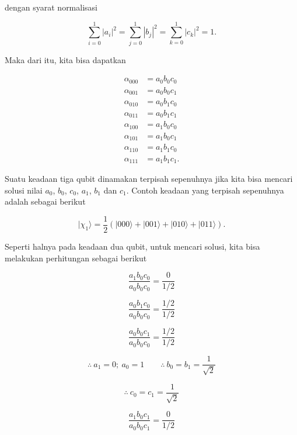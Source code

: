dengan syarat normalisasi

\begin{equation}
\sum_{i=0}^{1} |a_i|^2
=
\sum_{j=0}^{1} |b_j|^2
=
\sum_{k=0}^{1} |c_k|^2
= 1 .
\end{equation}

Maka dari itu, kita bisa dapatkan

\begin{align}
\alpha_{000} &= a_0 b_0 c_0 \nonumber \\
\alpha_{001} &= a_0 b_0 c_1 \nonumber \\
\alpha_{010} &= a_0 b_1 c_0 \nonumber \\
\alpha_{011} &= a_0 b_1 c_1 \nonumber \\
\alpha_{100} &= a_1 b_0 c_0 \nonumber \\
\alpha_{101} &= a_1 b_0 c_1 \nonumber \\
\alpha_{110} &= a_1 b_1 c_0 \nonumber \\
\alpha_{111} &= a_1 b_1 c_1 .
\end{align}

Suatu keadaan tiga qubit dinamakan terpisah sepenuhnya jika kita bisa mencari solusi
nilai $a_0$, $b_0$, $c_0$, $a_1$, $b_1$ dan $c_1$. Contoh keadaan
yang terpisah sepenuhnya adalah sebagai berikut

\begin{equation}
|\chi_1\rangle =
\frac{1}{2}
\left(
|000\rangle + |001\rangle + |010\rangle + |011\rangle
\right) .
\end{equation}

Seperti halnya pada keadaan dua qubit, untuk mencari solusi,
kita bisa melakukan perhitungan sebagai berikut

\begin{equation}
\frac{a_1 b_0 c_0}{a_0 b_0 c_0}
=
\frac{0}{1/2}
\end{equation}

\begin{equation}
\frac{a_0 b_1 c_0}{a_0 b_0 c_0}
=
\frac{1/2}{1/2}
\end{equation}

\begin{equation}
\frac{a_0 b_0 c_1}{a_0 b_0 c_0}
=
\frac{1/2}{1/2}
\end{equation}

\[
\therefore \ a_1 = 0 ; \ a_0 = 1
\qquad
\therefore \ b_0 = b_1 = \frac{1}{\sqrt{2}}
\]

\[
\therefore \ c_0 = c_1 = \frac{1}{\sqrt{2}}
\]

\begin{equation}
\frac{a_1 b_0 c_1}{a_0 b_0 c_1}
=
\frac{0}{1/2}
\end{equation}

